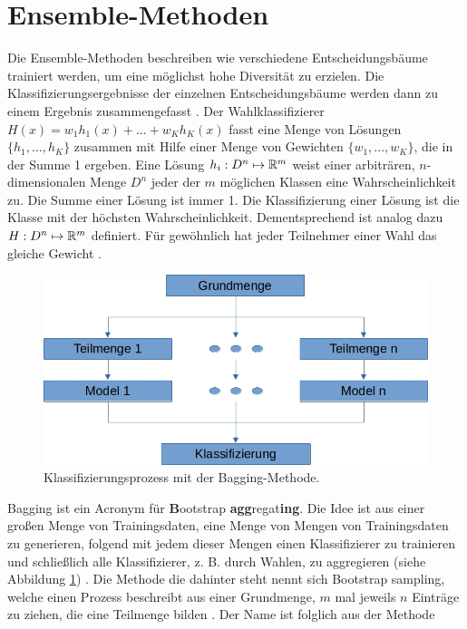 \section{Ensemble-Methoden}
\label{sec:Ensemble}
\label{sec:wahlklassifizierer}
Die Ensemble-Methoden beschreiben wie verschiedene Entscheidungsbäume trainiert werden, um eine möglichst hohe Diversität zu erzielen. Die Klassifizierungsergebnisse der einzelnen Entscheidungsbäume werden
dann zu einem Ergebnis zusammengefasst \cite{dietterich2002ensemble}.
\newline
\newline
Der Wahlklassifizierer $H(x) = w_1 h_1(x) + ... + w_K h_K(x)$ fasst eine Menge von Lösungen $\{h_1, ..., h_K\}$ zusammen mit Hilfe einer Menge von Gewichten $\{w_1, ..., w_K\}$, die in der Summe 1
ergeben. Eine Lösung $h_i: D^n \mapsto {\mathbb R}^m$ weist einer arbiträren, $n$-dimensionalen Menge $D^n$ jeder der $m$ möglichen Klassen eine Wahrscheinlichkeit zu.
Die Summe einer Lösung ist immer 1. Die Klassifizierung einer Lösung ist die Klasse mit der höchsten Wahrscheinlichkeit. Dementsprechend ist analog dazu $H: D^n \mapsto {\mathbb R}^m$ definiert.
Für gewöhnlich hat jeder Teilnehmer einer Wahl das gleiche Gewicht \cite{dietterich2002ensemble}.
\begin{figure}
    \centering
    \includegraphics[width=0.6\linewidth]{images/bagging.jpg}
    \caption{Klassifizierungsprozess mit der Bagging-Methode.}
    \label{fig:bagging}
\end{figure}
\newline
\newline
Bagging ist ein Acronym für \glqq \textbf{B}ootstrap \textbf{agg}regat\textbf{ing}\grqq. Die Idee ist aus einer großen Menge von Trainingsdaten, eine Menge von Mengen von Trainingsdaten zu generieren, folgend mit jedem
dieser Mengen einen Klassifizierer zu trainieren und schließlich alle Klassifizierer, z. B. durch Wahlen, zu aggregieren (siehe Abbildung \ref{fig:bagging}) \cite{breiman1996bagging}. Die Methode die dahinter steht nennt
sich \glqq Bootstrap sampling\grqq, welche einen Prozess beschreibt aus einer Grundmenge, $m$ mal jeweils $n$ Einträge zu ziehen, die eine Teilmenge bilden \cite{efron1992bootstrap}. Der Name ist folglich aus der Methode
